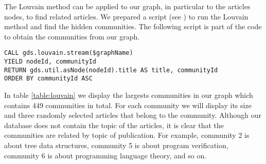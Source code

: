 \documentclass[11pt, a4paper]{article}
\begin{document}


The Louvain method can be applied to our graph, in particular to the articles nodes, to find related articles. We prepared a script (see ) to run the Louvain method and find the hidden communities. The following script is part of the code to obtain the communities from our graph.

\begin{lstlisting}[basicstyle=\tiny,breaklines=false]
CALL gds.louvain.stream($graphName)
YIELD nodeId, communityId
RETURN gds.util.asNode(nodeId).title AS title, communityId
ORDER BY communityId ASC
\end{lstlisting}

In table \ref{table:louvain} we display the largests communities in our graph which contains 449 communities in total. For each community we will display its size and three randomly selected articles that belong to the community. Although our database does not contain the topic of the articles, it is clear that the communities are related by topic of publication. For example, community 2 is about tree data structures, community 5 is about program verification, community 6 is about programming language theory, and so on.
\end{document}
